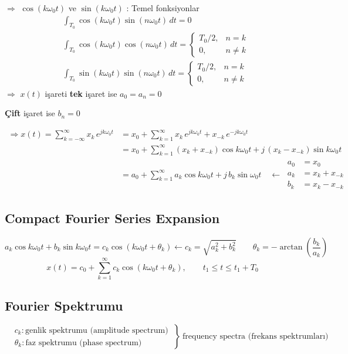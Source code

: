 \documentclass[11pt,a4paper]{article}
\begin{document}
$\Rightarrow$ $\cos(k\omega_0 t)$ ve $\sin(k\omega_0 t)$ : Temel fonksiyonlar
\begin{align*}
  & \int_{T_0} \cos(k\omega_0 t)\sin(n\omega_0 t)\,dt = 0 \\
  & \int_{T_0} \cos(k\omega_0 t)\cos(n\omega_0 t)\,dt = \begin{cases} T_0/2, & n = k \\ 0, & n \neq k \end{cases} \\
  & \int_{T_0} \sin(k\omega_0 t)\sin(n\omega_0 t)\,dt = \begin{cases} T_0/2, & n = k \\ 0, & n \neq k \end{cases}
\end{align*}
$\Rightarrow$ $x(t)$ işareti \textbf{tek} işaret ise $a_0 = a_n = 0$

\phantom{$\Rightarrow$ $x(t)$ işareti }\textbf{Çift} işaret ise $b_n = 0$

\begin{align*}
  \Rightarrow x(t) = \sum_{k=-\infty}^{\infty} x_k\,e^{jk\omega_0 t} &= x_0 + \sum_{k=1}^{\infty} x_k\,e^{jk\omega_0 t} + x_{-k}\,e^{-jk\omega_0 t} \\
  &= x_0 + \sum_{k=1}^{\infty} (x_k + x_{-k})\cos k\omega_0 t + j\,(x_k - x_{-k})\sin k\omega_0 t \\
  &= a_0 + \sum_{k=1}^{\infty} a_k\cos k\omega_0 t + j\,b_k\sin\omega_0 t \quad \longleftarrow \ \begin{aligned} a_0 &= x_0 \\ a_k &= x_k + x_{-k} \\ b_k &= x_k - x_{-k} \end{aligned}
\end{align*}

\subsection{Compact Fourier Series Expansion}
\[ a_k\cos k\omega_0 t + b_k\sin k\omega_0 t = c_k\cos(k\omega_0 t + \theta_k) \longleftarrow c_k = \sqrt{a_k^2 + b_k^2} \qquad \theta_k = -\arctan\left(\frac{b_k}{a_k}\right) \]
\[ x(t) = c_0 + \sum_{k=1}^{\infty} c_k\cos(k\omega_0 t + \theta_k), \qquad t_1 \leq t \leq t_1 + T_0 \]

\subsection{Fourier Spektrumu}
\[ \left.\begin{aligned} & c_k: \text{genlik spektrumu (amplitude spectrum)} \\ & \theta_k: \text{faz spektrumu (phase spectrum)} \end{aligned}\ \right\}\ \text{frequency spectra (frekans spektrumları)} \]
\end{document}
